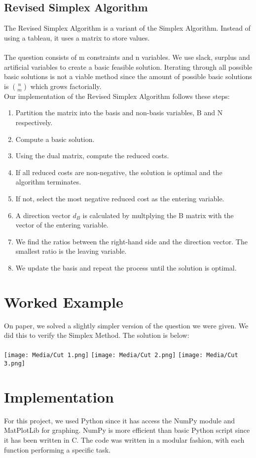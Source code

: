 \documentclass{article}
\numberwithin{equation}{section}
\begin{document}
\subsection{Revised Simplex Algorithm}
The Revised Simplex Algorithm is a variant of the Simplex Algorithm. Instead of using a tableau, it uses a matrix to store values.\\ \\
The question consists of m constraints and n variables. We use slack, surplus and artificial variables to create a basic feasible solution. Iterating through all possible basic solutions is not a viable method since the amount of possible basic solutions is $\binom{n}{m}$ which grows factorially.\\
Our implementation of the Revised Simplex Algorithm follows these steps:
\begin{enumerate}
    \item Partition the matrix into the basis and non-basis variables, B and N respectively.
    \item Compute a basic solution.
    \item Using the dual matrix, compute the reduced costs.
    \item If all reduced costs are non-negative, the solution is optimal and the algorithm terminates.
    \item If not, select the most negative reduced cost as the entering variable.
    \item A direction vector $d_B$ is calculated by multplying the B matrix with the vector of the entering variable.
    \item We find the ratios between the right-hand side and the direction vector. The smallest ratio is the leaving variable.
    \item We update the basis and repeat the process until the solution is optimal.
\end{enumerate}
\newpage
\section{Worked Example}
On paper, we solved a slightly simpler version of the question we were given. We did this to verify the Simplex Method. The solution is below: \\ \\
\texttt{[image: Media/Cut 1.png]}
\texttt{[image: Media/Cut 2.png]}
\texttt{[image: Media/Cut 3.png]}
\newpage
\section{Implementation}
For this project, we used Python since it has access the NumPy module and MatPlotLib for graphing. NumPy is more efficient than basic Python script since it has been written in C. The code was written in a modular fashion, with each function performing a specific task.
\end{document}
